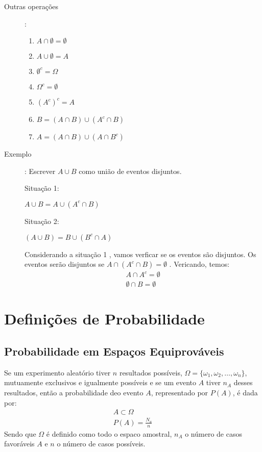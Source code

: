 \documentclass[11pt,a4paper]{book}
\begin{document}
\begin{description}
\begin{description}
    \item [Outras operações]: 

      \begin{enumerate}[leftmargin=*, label=\Roman*., widest=IV, align=left]
        \item     $A \cap \emptyset= \emptyset$ 
        \item     $A \cup \emptyset = A$ 
        \item     $\emptyset^{c} = \Omega$ 
        \item     $ \Omega^c = \emptyset$ 
        \item     $(A^c)^c = A$ 
        \item     $B= (A \cap B)\cup (A^c \cap B)$
        \item     $A= (A \cap B) \cup (A \cap B^c)$
      \end{enumerate}
    \item [Exemplo]: Escrever $A \cup B$ como união de eventos disjuntos.

      \begin{figure}[H]
        \centering
        
        \caption{}
        \label{fig:11}
      \end{figure}

      Situação 1:

      $A \cup B = A \cup (A^c \cap B)$

      Situação 2: 


      $(A \cup B) = B \cup (B^c \cap A)$

      Considerando a situação 1 , vamos verficar se os eventos são disjuntos. Os eventos serão disjuntos se $A \cap ( A^c \cap B )= \emptyset$ . Vericando, temos: 
      \begin{align*}
        A \cap A^c = \emptyset \\
        \emptyset \cap B= \emptyset
      \end{align*}

  \end{description}
\end{description}
\section{Definições de Probabilidade}
\subsection{Probabilidade em Espaços Equiprováveis}
Se um experimento aleatório tiver $n$ resultados possíveis, $\Omega = \{ \omega_1,\omega_2,\ldots,\omega_n \}$, mutuamente exclusivos e igualmente possíveis e se um evento $A$ tiver $n_A$ desses resultados, então a probabilidade deo evento $A$, representado por $P(A)$, é dada por: 
\begin{align}
  A \subset \Omega \nonumber\\
  P(A)= \frac{N_a}{n} 
\end{align}
Sendo que $\Omega$ é definido como todo o espaco amostral, $n_A$ o número de casos favoráveis $A$ e $n$ o número de casos possíveis.
\end{document}
